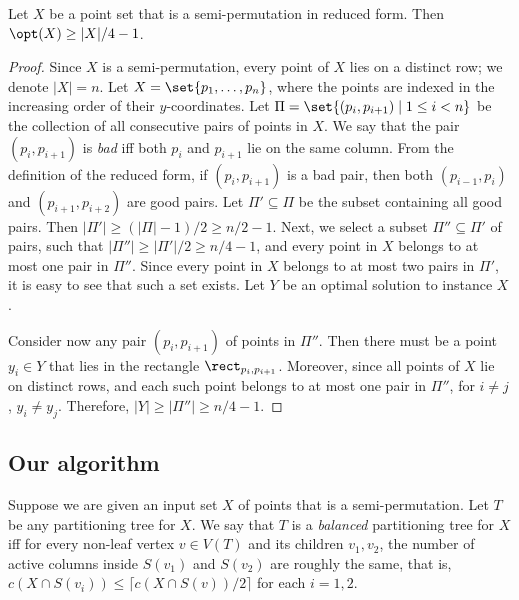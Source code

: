 \documentclass{toc}
\begin{document}
\begin{lemma}\label{lem: bound on WB for reduced}
        Let $X$ be a point set that is a semi-permutation in reduced form. Then $\opt(X)\geq |X|/4-1$. 
\end{lemma}
\begin{proof}
Since $X$ is a semi-permutation, every point of $X$ lies on a distinct row; we denote $|X|=n$. Let $X=\set{p_1,\ldots,p_n}$, where the points are indexed in the increasing order of their $y$-coordinates. 
Let $\Pi=\set{(p_i,p_{i+1})\mid 1\leq i<n}$ be the collection of all consecutive pairs of points in $X$. We say that the pair $(p_i,p_{i+1})$ is \emph{bad} iff both $p_i$ and $p_{i+1}$ lie on the same column. From the definition of the reduced form, if $(p_i,p_{i+1})$ is a bad pair, then both $(p_{i-1},p_i)$ and $(p_{i+1},p_{i+2})$ are good pairs. Let $\Pi'\subseteq \Pi$ be the subset containing all good pairs. Then $|\Pi'|\geq (|\Pi|-1)/2\geq n/2-1$. Next, we select a subset $\Pi''\subseteq \Pi'$ of pairs, such that $|\Pi''|\geq |\Pi'|/2\geq n/4-1$, and every point in $X$ belongs to at most one pair in $\Pi''$. Since every point in $X$ belongs to at most two pairs in $\Pi'$, it is easy to see that such a set exists. Let $Y$ be an optimal solution to instance $X$.

Consider now any pair $(p_i,p_{i+1})$ of points in $\Pi''$. Then there must be a point $y_i\in Y$ that lies in the rectangle $\rect_{p_i,p_{i+1}}$. Moreover, since all points of $X$ lie on distinct rows, and each such point belongs to at most one pair in $\Pi''$, for $i\neq j$, $y_i\neq y_j$. Therefore, $|Y|\geq |\Pi''|\geq n/4-1$.
\end{proof}





\subsection{Our algorithm} 
\newcommand{\progspace}{\hspace{0.5cm}} 

Suppose we are given an input set $X$ of points that is a semi-permutation. Let $T$ be any partitioning tree for $X$. We say that $T$ is a \emph{balanced} partitioning tree for $X$ iff for every non-leaf vertex $v\in V(T)$ and its children $v_1,v_2$, the number of active columns inside $S(v_1)$ and $S(v_2)$ are roughly the same, that is, $c(X \cap S(v_i)) \leq \lceil c(X\cap S(v))/2 \rceil$ for each $i =1,2$. 

%
\end{document}
